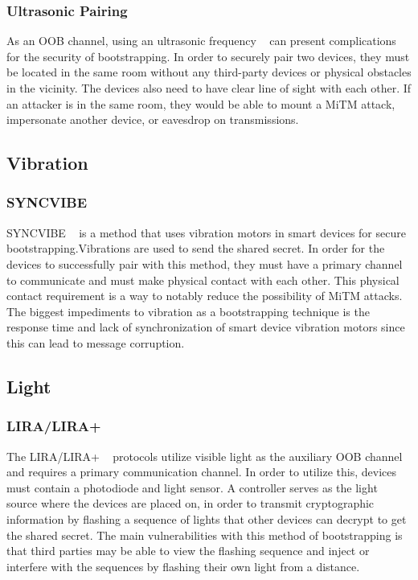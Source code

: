 \subsubsection{Ultrasonic Pairing}
As an OOB channel, using an ultrasonic frequency ~\cite{mayrhofer2007security} can present complications for the security of bootstrapping. In order to securely pair two devices, they must be located in the same room without any third-party devices or physical obstacles in the vicinity. The devices also need to have clear line of sight with each other. If an attacker is in the same room, they would be able to mount a MiTM attack, impersonate another device, or eavesdrop on transmissions. 

\subsection{Vibration}
\subsubsection{SYNCVIBE}
SYNCVIBE ~\cite{lee2018syncvibe} is a method that uses vibration motors in smart devices for secure bootstrapping.Vibrations are used to send the shared secret. In order for the devices to successfully pair with this method, they must have a primary channel to communicate and must make physical contact with each other. This physical contact requirement is a way to notably reduce the possibility of MiTM attacks. The biggest impediments to vibration as a bootstrapping technique is the response time and lack of synchronization of smart device vibration motors since this can lead to message corruption.


\subsection{Light}
\subsubsection{LIRA/LIRA+}
The LIRA/LIRA+ ~\cite{kovavcevic2016flashing} protocols utilize visible light as the auxiliary OOB channel and requires a primary communication channel. In order to utilize this, devices must contain a photodiode and light sensor. A controller serves as the light source where the devices are placed on, in order to transmit cryptographic information by flashing a sequence of lights that other devices can decrypt to get the shared secret. The main vulnerabilities with this method of bootstrapping is that third parties may be able to view the flashing sequence and inject or interfere with the sequences by flashing their own light from a distance. 

